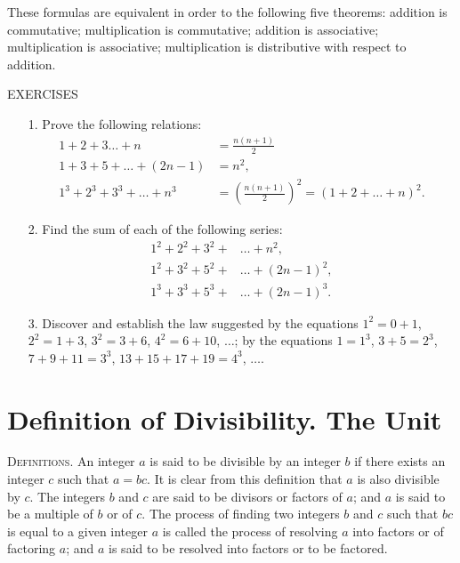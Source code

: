 \documentclass[oneside]{book}
\begin{document}
\newpage
These formulas are equivalent in order to the following five
theorems: addition is commutative; multiplication is commutative;
addition is associative; multiplication is associative;
multiplication is distributive with respect to addition.

\begin{center}
EXERCISES
\end{center}

\small \begin{enumerate}
\item[1.] Prove the following relations:
\begin{align*}
          1 + 2 + 3 \ldots + n &= \frac{n(n+1)}{2} \\
 1 + 3 + 5 + \ldots + (2n - 1) &= n^2,             \\
1^3 + 2^3 + 3^3 + \ldots + n^3 &= \left(\frac{n(n+1)}{2}\right)^2
  = (1+2+\ldots+n)^2.
\end{align*}

\item[2.] Find the sum of each of the following series:
\begin{align*}
1^2 + 2^2 + 3^2 + &\ldots + n^2,        \\
1^2 + 3^2 + 5^2 + &\ldots + (2n - 1)^2, \\
1^3 + 3^3 + 5^3 + &\ldots + (2n - 1)^3.
\end{align*}

\item[3.] Discover and establish the law suggested by the equations
$1^2 = 0 + 1$, $2^2 = 1 + 3$, $3^2 = 3 + 6$, $4^2 = 6 + 10$,
$\ldots$; by the equations $1 = 1^3$, $3 + 5 = 2^3$, $7 + 9 + 11 =
3^3$, $13 + 15 + 17 + 19 = 4^3$, $\ldots$.
\end{enumerate} \normalsize

\section{Definition of Divisibility. The Unit}\label{s2}%

\textsc{Definitions.} An integer $a$ is said to be divisible by an
integer $b$ if there exists an integer $c$ such that $a = bc$. It is
clear from this definition that $a$ is also divisible by $c$. The
integers $b$ and $c$ are said to be divisors or factors of $a$; and
$a$ is said to be a multiple of $b$ or of $c$. The process of
finding two integers $b$ and $c$ such that $bc$ is equal to a given
integer $a$ is called the process of resolving $a$ into factors or
of factoring $a$; and $a$ is said to be resolved into factors or to
be factored.
\end{document}
